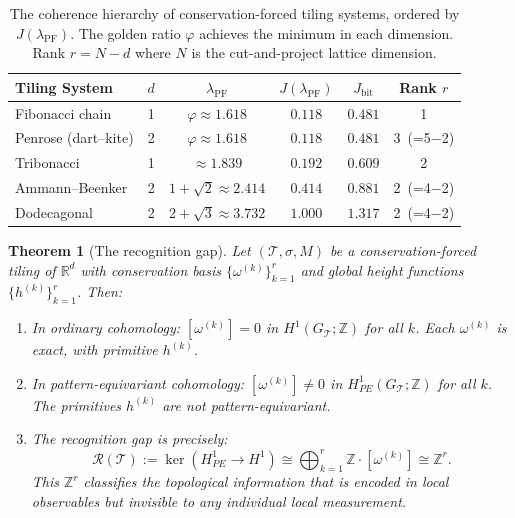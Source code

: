 \documentclass[12pt]{article}
\newtheorem{theorem}{Theorem}[section]
\theoremstyle{definition}
\theoremstyle{remark}
\newcommand{\RR}{\mathbb{R}}
\newcommand{\ZZ}{\mathbb{Z}}
\DeclareMathOperator{\PF}{PF}
\begin{document}
\begin{table}[h]
\centering
\small
\begin{tabular}{lccccc}
\toprule
\textbf{Tiling System} & $d$ & $\lambda_\PF$ & $J(\lambda_\PF)$ & $J_{\mathrm{bit}}$ & \textbf{Rank $r$} \\
\midrule
Fibonacci chain & 1 & $\varphi \approx 1.618$ & $0.118$ & $0.481$ & 1 \\
Penrose (dart--kite) & 2 & $\varphi \approx 1.618$ & $0.118$ & $0.481$ & 3~(=5$-$2) \\
Tribonacci & 1 & $\approx 1.839$ & $0.192$ & $0.609$ & 2 \\
Ammann--Beenker & 2 & $1 + \sqrt{2} \approx 2.414$ & $0.414$ & $0.881$ & 2~(=4$-$2) \\
Dodecagonal & 2 & $2 + \sqrt{3} \approx 3.732$ & $1.000$ & $1.317$ & 2~(=4$-$2) \\
\bottomrule
\end{tabular}
\caption{The coherence hierarchy of conservation-forced tiling systems, ordered by $J(\lambda_\PF)$. The golden ratio $\varphi$ achieves the minimum in each dimension. Rank $r = N - d$ where $N$ is the cut-and-project lattice dimension.}
\label{tab:hierarchy}
\end{table}

\begin{theorem}[The recognition gap]
\label{thm:recognition-gap}
Let $(\mathcal{T}, \sigma, M)$ be a conservation-forced tiling of $\RR^d$ with conservation basis $\{\omega^{(k)}\}_{k=1}^r$ and global height functions $\{h^{(k)}\}_{k=1}^r$. Then:
\begin{enumerate}
\item[(i)] In ordinary cohomology: $[\omega^{(k)}] = 0$ in $H^1(G_{\mathcal{T}}; \ZZ)$ for all $k$. Each $\omega^{(k)}$ is exact, with primitive $h^{(k)}$.
\item[(ii)] In pattern-equivariant cohomology: $[\omega^{(k)}] \neq 0$ in $H^1_{PE}(G_{\mathcal{T}}; \ZZ)$ for all $k$. The primitives $h^{(k)}$ are not pattern-equivariant.
\item[(iii)] The \emph{recognition gap} is precisely:
\begin{equation}
\mathcal{R}(\mathcal{T}) := \ker\!\left(H^1_{PE} \to H^1\right) \cong \bigoplus_{k=1}^r \ZZ \cdot [\omega^{(k)}] \cong \ZZ^r.
\label{eq:recognition-gap}
\end{equation}
This $\ZZ^r$ classifies the topological information that is \emph{encoded in local observables but invisible to any individual local measurement}.
\end{enumerate}
\end{theorem}
\end{document}
